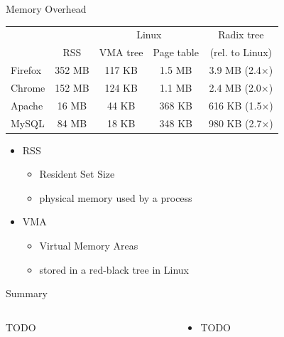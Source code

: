 \documentclass[aspectratio=169]{beamer}
\newcommand{\bi}{\begin{itemize}}
\newcommand{\ei}{\end{itemize}}
\begin{document}
\begin{frame}{Memory Overhead}
  \begin{center}
    \begin{tabular}{ l | c | c c | c }
              &        & \multicolumn{2}{c|}{Linux} & Radix tree \\
              & RSS    & VMA tree & Page table      & (rel. to Linux) \\
      \hline
      Firefox & 352 MB & 117 KB   & 1.5 MB          & 3.9 MB (2.4$\times$) \\
      Chrome  & 152 MB & 124 KB   & 1.1 MB          & 2.4 MB (2.0$\times$) \\
      Apache  & 16 MB  & 44 KB    & 368 KB          & 616 KB (1.5$\times$) \\
      MySQL   & 84 MB  & 18 KB    & 348 KB          & 980 KB (2.7$\times$) \\
    \end{tabular}
    \vspace{1em}
    \bi
  \item RSS
    \bi
  \item Resident Set Size
  \item physical memory used by a process
    \ei
  \item VMA
    \bi
  \item Virtual Memory Areas
  \item stored in a red-black tree in Linux
    \ei
    \ei
  \end{center}
\end{frame}

\begin{frame}{Summary}
  \begin{columns}[T]
    \begin{column}{0.2\textwidth}
      TODO
    \end{column}
    \begin{column}{0.8\textwidth}
      \bi
    \item TODO
      \ei
    \end{column}
  \end{columns}
\end{frame}


\end{document}
